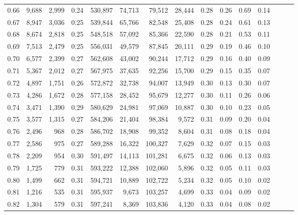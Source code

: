 \begin{tabular}{rrrrrrrrrrrrrrr}
0.66 &   9,688 &  2,999 &  0.24 &  530,897 &   74,713 &   79,512 &   28,444 &  0.28 &  0.26 &  0.69 &      0.14 \\
0.67 &   8,947 &  3,036 &  0.25 &  539,844 &   65,766 &   82,548 &   25,408 &  0.28 &  0.24 &  0.61 &      0.13 \\
0.68 &   8,674 &  2,818 &  0.25 &  548,518 &   57,092 &   85,366 &   22,590 &  0.28 &  0.21 &  0.53 &      0.11 \\
0.69 &   7,513 &  2,479 &  0.25 &  556,031 &   49,579 &   87,845 &   20,111 &  0.29 &  0.19 &  0.46 &      0.10 \\
0.70 &   6,577 &  2,399 &  0.27 &  562,608 &   43,002 &   90,244 &   17,712 &  0.29 &  0.16 &  0.40 &      0.09 \\
0.71 &   5,367 &  2,012 &  0.27 &  567,975 &   37,635 &   92,256 &   15,700 &  0.29 &  0.15 &  0.35 &      0.07 \\
0.72 &   4,897 &  1,751 &  0.26 &  572,872 &   32,738 &   94,007 &   13,949 &  0.30 &  0.13 &  0.30 &      0.07 \\
0.73 &   4,286 &  1,672 &  0.28 &  577,158 &   28,452 &   95,679 &   12,277 &  0.30 &  0.11 &  0.26 &      0.06 \\
0.74 &   3,471 &  1,390 &  0.29 &  580,629 &   24,981 &   97,069 &   10,887 &  0.30 &  0.10 &  0.23 &      0.05 \\
0.75 &   3,577 &  1,315 &  0.27 &  584,206 &   21,404 &   98,384 &    9,572 &  0.31 &  0.09 &  0.20 &      0.04 \\
0.76 &   2,496 &    968 &  0.28 &  586,702 &   18,908 &   99,352 &    8,604 &  0.31 &  0.08 &  0.18 &      0.04 \\
0.77 &   2,586 &    975 &  0.27 &  589,288 &   16,322 &  100,327 &    7,629 &  0.32 &  0.07 &  0.15 &      0.03 \\
0.78 &   2,209 &    954 &  0.30 &  591,497 &   14,113 &  101,281 &    6,675 &  0.32 &  0.06 &  0.13 &      0.03 \\
0.79 &   1,725 &    779 &  0.31 &  593,222 &   12,388 &  102,060 &    5,896 &  0.32 &  0.05 &  0.11 &      0.03 \\
0.80 &   1,499 &    662 &  0.31 &  594,721 &   10,889 &  102,722 &    5,234 &  0.32 &  0.05 &  0.10 &      0.02 \\
0.81 &   1,216 &    535 &  0.31 &  595,937 &    9,673 &  103,257 &    4,699 &  0.33 &  0.04 &  0.09 &      0.02 \\
0.82 &   1,304 &    579 &  0.31 &  597,241 &    8,369 &  103,836 &    4,120 &  0.33 &  0.04 &  0.08 &      0.02 \\

\end{tabular}
